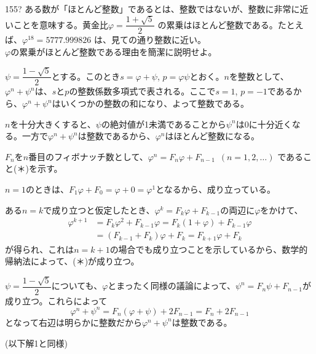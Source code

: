 \begin{prob}{155}{\hosi ?}{}
 ある数が「ほとんど整数」であるとは、整数ではないが、整数に非常に近いことを意味する。黄金比$\varphi=\dfrac{1+\sqrt{5}}{2}$ の累乗はほとんど整数である。たとえば、$\varphi^{18}=5777.999826$ は、見ての通り整数に近い。 \\
 $\varphi$の累乗がほとんど整数である理由を簡潔に説明せよ。
\end{prob}
$\psi=\dfrac{1-\sqrt{5}}{2}$とする。このとき$s=\varphi+\psi$, $p=\varphi\psi$とおく。$n$を整数として、$\varphi^n+\psi^n$は、$s$と$p$の整数係数多項式で表される。ここで$s=1$, $p=-1$であるから、$\varphi^n+\psi^n$はいくつかの整数の和になり、よって整数である。

$n$を十分大きくすると、$\psi$の絶対値が1未満であることから$\psi^n$は0に十分近くなる。一方で$\varphi^n+\psi^n$は整数であるから、$\varphi^n$はほとんど整数になる。

$F_n$を$n$番目のフィボナッチ数として、$\varphi^n=F_n\varphi+F_{n-1}$~$(n=1,2,\dots)$ であること(＊)を示す。

$n=1$のときは、$F_1\varphi+F_0=\varphi+0=\varphi^1$となるから、成り立っている。

ある$n=k$で成り立つと仮定したとき、$\varphi^k=F_k\varphi+F_{k-1}$の両辺に$\varphi$をかけて、
\begin{align*}
 \varphi^{k+1}&=F_k\varphi^2+F_{k-1}\varphi=F_k(1+\varphi)+F_{k-1}\varphi \\
 &= (F_{k-1}+F_k)\varphi+F_k=F_{k+1}\varphi+F_k
\end{align*}
が得られ、これは$n=k+1$の場合でも成り立つことを示しているから、数学的帰納法によって、(＊)が成り立つ。

$\psi=\dfrac{1-\sqrt{5}}{2}$についても、$\varphi$とまったく同様の議論によって、$\psi^n=F_n\psi+F_{n-1}$が成り立つ。これらによって
\[ \varphi^n+\psi^n=F_n(\varphi+\psi)+2F_{n-1}=F_n+2F_{n-1} \]
となって右辺は明らかに整数だから$\varphi^n+\psi^n$は整数である。

(以下解1と同様)